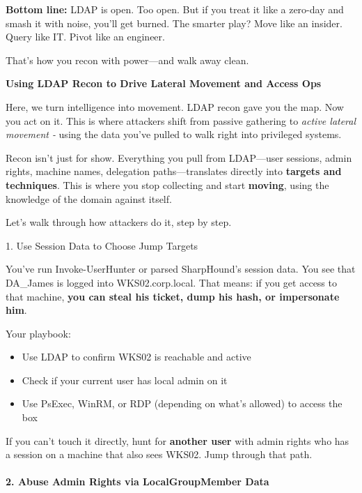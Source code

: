 \textbf{Bottom line:} LDAP is open. Too open. But if you treat it like a zero-day and smash it with noise, you’ll get burned. The smarter play? Move like an insider. Query like IT. Pivot like an engineer.

That’s how you recon with power—and walk away clean.

\textbf{Using LDAP Recon to Drive Lateral Movement and Access Ops}

Here, we turn intelligence into movement. LDAP recon gave you the map. Now you act on it. This is where attackers shift from passive gathering to \textit{active lateral movement - }using the data you’ve pulled to walk right into privileged systems.

Recon isn’t just for show. Everything you pull from LDAP—user sessions, admin rights, machine names, delegation paths—translates directly into \textbf{targets and techniques}. This is where you stop collecting and start \textbf{moving}, using the knowledge of the domain against itself.

Let’s walk through how attackers do it, step by step.

 1. Use Session Data to Choose Jump Targets

You’ve run Invoke-UserHunter or parsed SharpHound’s session data. You see that DA\_James is logged into WKS02.corp.local. That means: if you get access to that machine, \textbf{you can steal his ticket, dump his hash, or impersonate him}.

Your playbook:

\begin{itemize}
    \item Use LDAP to confirm WKS02 is reachable and active

    \item Check if your current user has local admin on it

    \item Use PsExec, WinRM, or RDP (depending on what’s allowed) to access the box

\end{itemize}
If you can’t touch it directly, hunt for \textbf{another user} with admin rights who has a session on a machine that also sees WKS02. Jump through that path.

\paragraph{\textbf{   2. Abuse Admin Rights via LocalGroupMember Data}}


